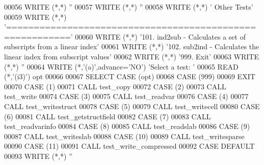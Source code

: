 \begin{DoxyCode}
00056         \textcolor{keyword}{WRITE} (*,*) \textcolor{stringliteral}{''}
00057         \textcolor{keyword}{WRITE} (*,*) \textcolor{stringliteral}{''}
00058         \textcolor{keyword}{WRITE} (*,*) \textcolor{stringliteral}{'   Other Tests'}
00059         \textcolor{keyword}{WRITE} (*,*) \textcolor{stringliteral}{'========================================================='}
00060         \textcolor{keyword}{WRITE} (*,*) \textcolor{stringliteral}{'101. ind2sub - Calculates a set of subscripts from a linear index'}
00061         \textcolor{keyword}{WRITE} (*,*) \textcolor{stringliteral}{'102. sub2ind - Calculates the linear index from subscript values'}
00062         \textcolor{keyword}{WRITE} (*,*) \textcolor{stringliteral}{'999.  Exit'}
00063         \textcolor{keyword}{WRITE} (*,*) \textcolor{stringliteral}{''}
00064         \textcolor{keyword}{WRITE} (*,\textcolor{stringliteral}{'(a)'},advance=\textcolor{stringliteral}{'NO'}) \textcolor{stringliteral}{'Select a test: '}
00065         \textcolor{keyword}{READ} (*,\textcolor{stringliteral}{'(i3)'}) opt
00066 
00067         \textcolor{keywordflow}{SELECT CASE} (opt)
00068             \textcolor{keywordflow}{CASE} (999)
00069                 \textcolor{keywordflow}{EXIT}
00070             \textcolor{keywordflow}{CASE} (1)
00071                 \textcolor{keyword}{CALL }test\_copy
00072             \textcolor{keywordflow}{CASE} (2)
00073                 \textcolor{keyword}{CALL }test\_write
00074             \textcolor{keywordflow}{CASE} (3)
00075                 \textcolor{keyword}{CALL }test\_readvar
00076             \textcolor{keywordflow}{CASE} (4)
00077                 \textcolor{keyword}{CALL }test\_writestruct
00078             \textcolor{keywordflow}{CASE} (5)
00079                 \textcolor{keyword}{CALL }test\_writecell
00080             \textcolor{keywordflow}{CASE} (6)
00081                 \textcolor{keyword}{CALL }test\_getstructfield
00082             \textcolor{keywordflow}{CASE} (7)
00083                 \textcolor{keyword}{CALL }test\_readvarinfo
00084             \textcolor{keywordflow}{CASE} (8)
00085                 \textcolor{keyword}{CALL }test\_readslab
00086             \textcolor{keywordflow}{CASE} (9)
00087                 \textcolor{keyword}{CALL }test\_writeslab
00088             \textcolor{keywordflow}{CASE} (10)
00089                 \textcolor{keyword}{CALL }test\_writesparse
00090             \textcolor{keywordflow}{CASE} (11)
00091                 \textcolor{keyword}{CALL }test\_write\_compressed
00092 \textcolor{keywordflow}{            CASE DEFAULT}
00093                 \textcolor{keyword}{WRITE} (*,*) \textcolor{stringliteral}{''}

\end{DoxyCode}
